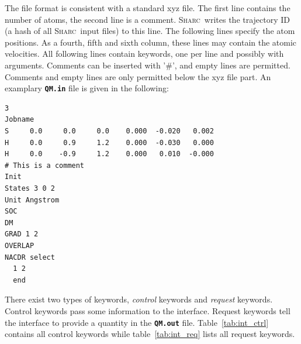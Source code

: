 \documentclass[a4paper,10pt,DIV=15,openany]{scrbook}
\newcommand{\sharc}{\textsc{Sharc}}
\newcommand{\ttt}[1]{\textbf{\texttt{#1}}}
\newenvironment{example}{
  \setlength{\OuterFrameSep}{3pt}
  \vspace{0mm}
  \definecolor{shadecolor}{HTML}{E4F4FF}
  \begin{shaded}
}{
  \end{shaded}
}
\begin{document}
The file format is consistent with a standard xyz file. The first line contains the number of atoms, the second line is a comment. \sharc\ writes the trajectory ID (a hash of all \sharc\ input files) to this line. The following lines specify the atom positions. As a fourth, fifth and sixth column, these lines may contain the atomic velocities.
All following lines contain keywords, one per line and possibly with arguments. Comments can be inserted with '\#', and empty lines are permitted. Comments and empty lines are only permitted below the xyz file part.
An examplary \ttt{QM.in} file is given in the following:
\begin{example}
  \begin{verbatim}
3
Jobname
S     0.0     0.0     0.0    0.000  -0.020   0.002
H     0.0     0.9     1.2    0.000  -0.030   0.000
H     0.0    -0.9     1.2    0.000   0.010  -0.000
# This is a comment
Init
States 3 0 2
Unit Angstrom
SOC
DM
GRAD 1 2
OVERLAP
NACDR select
  1 2
  end
\end{verbatim}
\end{example}

There exist two types of keywords, \textit{control} keywords and \textit{request} keywords. Control keywords pass some information to the interface. Request keywords tell the interface to provide a quantity in the \ttt{QM.out} file. Table~\ref{tab:int_ctrl} contains all control keywords while table~\ref{tab:int_req} lists all request keywords.
\end{document}
